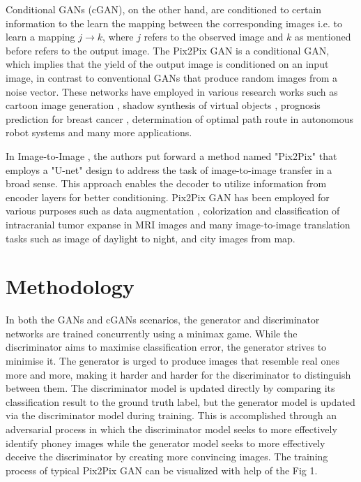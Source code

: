 \documentclass{./styles/svproc}
\begin{document}
Conditional GANs (cGAN), on the other hand, are conditioned to certain information to the learn the mapping between the corresponding images \cite{mirza2014conditional} i.e. to learn a mapping $j \rightarrow k$, where $j$ refers to the observed image and $k$ as mentioned before refers to the output image. The Pix2Pix GAN is a conditional GAN, which implies that the yield of the output image is conditioned on an input image, in contrast to conventional GANs that produce random images from a noise vector. These networks have employed in various research works such as cartoon image generation \cite{liu2017autopainter}, shadow synthesis of virtual objects \cite{Zhang2019}, prognosis prediction for breast cancer \cite{Zhang2022}, determination of optimal path route in autonomous robot systems \cite{9366777} and many more applications. 

In Image-to-Image \cite{isola2018imagetoimage}, the authors put forward a method named "Pix2Pix" that employs a "U-net" design \cite{ronneberger2015unet} to address the task of image-to-image transfer in a broad sense. This approach enables the decoder to utilize information from encoder layers for better conditioning. Pix2Pix GAN has been employed for various purposes such as data augmentation \cite{Toda2022} \cite{Hlscher2022}, colorization and classification of intracranial tumor expanse in MRI images \cite{Mehmood2022} and many image-to-image translation tasks such as image of daylight to night, and city images from map.

\section{Methodology}
In both the GANs and cGANs scenarios, the generator and discriminator networks are trained concurrently using a minimax game. While the discriminator aims to maximise classification error, the generator strives to minimise it. The generator is urged to produce images that resemble real ones more and more, making it harder and harder for the discriminator to distinguish between them. The discriminator model is updated directly by comparing its classification result to the ground truth label, but the generator model is updated via the discriminator model during training. This is accomplished through an adversarial process in which the discriminator model seeks to more effectively identify phoney images while the generator model seeks to more effectively deceive the discriminator by creating more convincing images. The training process of typical Pix2Pix GAN can be visualized with help of the Fig 1.
\end{document}
